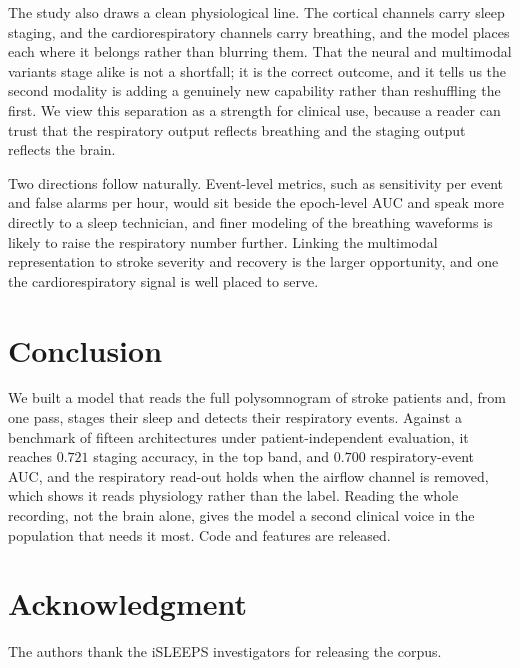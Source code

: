 \documentclass[journal]{IEEEtran}
\newcommand{\mmAcc}{0.721}
\newcommand{\mmAuc}{0.700}
\begin{document}
The study also draws a clean physiological line. The cortical channels carry sleep staging, and
the cardiorespiratory channels carry breathing, and the model places each where it belongs
rather than blurring them. That the neural and multimodal variants stage alike is not a
shortfall; it is the correct outcome, and it tells us the second modality is adding a genuinely
new capability rather than reshuffling the first. We view this separation as a strength for
clinical use, because a reader can trust that the respiratory output reflects breathing and the
staging output reflects the brain.

Two directions follow naturally. Event-level metrics, such as sensitivity per event and false
alarms per hour, would sit beside the epoch-level AUC and speak more directly to a sleep
technician, and finer modeling of the breathing waveforms is likely to raise the respiratory
number further. Linking the multimodal representation to stroke severity and recovery is the
larger opportunity, and one the cardiorespiratory signal is well placed to serve.

\section{Conclusion}
We built a model that reads the full polysomnogram of stroke patients and, from one pass,
stages their sleep and detects their respiratory events. Against a benchmark of fifteen
architectures under patient-independent evaluation, it reaches $\mmAcc$ staging accuracy, in
the top band, and $\mmAuc$ respiratory-event AUC, and the respiratory read-out holds when the
airflow channel is removed, which shows it reads physiology rather than the label. Reading the
whole recording, not the brain alone, gives the model a second clinical voice in the population
that needs it most. Code and features are released.

\section*{Acknowledgment}
The authors thank the iSLEEPS investigators for releasing the corpus.



\end{document}
